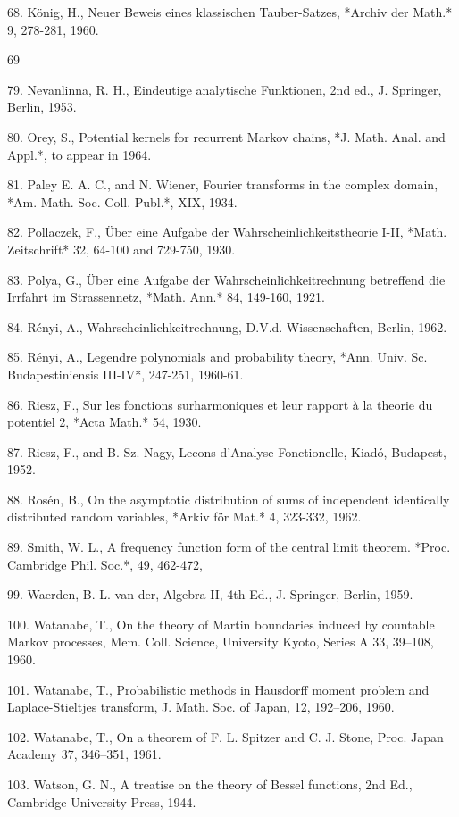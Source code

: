 68. König, H., Neuer Beweis eines klassischen Tauber-Satzes, *Archiv der Math.* 9, 278-281, 1960.

69

79. Nevanlinna, R. H., Eindeutige analytische Funktionen, 2nd ed., J. Springer, Berlin, 1953.

80. Orey, S., Potential kernels for recurrent Markov chains, *J. Math. Anal. and Appl.*, to appear in 1964.

81. Paley E. A. C., and N. Wiener, Fourier transforms in the complex domain, *Am. Math. Soc. Coll. Publ.*, XIX, 1934.

82. Pollaczek, F., Über eine Aufgabe der Wahrscheinlichkeitstheorie I-II, *Math. Zeitschrift* 32, 64-100 and 729-750, 1930.

83. Polya, G., Über eine Aufgabe der Wahrscheinlichkeitrechnung betreffend die Irrfahrt im Strassennetz, *Math. Ann.* 84, 149-160, 1921.

84. Rényi, A., Wahrscheinlichkeitrechnung, D.V.d. Wissenschaften, Berlin, 1962.

85. Rényi, A., Legendre polynomials and probability theory, *Ann. Univ. Sc. Budapestiniensis III-IV*, 247-251, 1960-61.

86. Riesz, F., Sur les fonctions surharmoniques et leur rapport à la theorie du potentiel 2, *Acta Math.* 54, 1930.

87. Riesz, F., and B. Sz.-Nagy, Lecons d'Analyse Fonctionelle, Kiadó, Budapest, 1952.

88. Rosén, B., On the asymptotic distribution of sums of independent identically distributed random variables, *Arkiv för Mat.* 4, 323-332, 1962.

89. Smith, W. L., A frequency function form of the central limit theorem. *Proc. Cambridge Phil. Soc.*, 49, 462-472,

99. Waerden, B. L. van der, Algebra II, 4th Ed., J. Springer, Berlin, 1959.

100. Watanabe, T., On the theory of Martin boundaries induced by countable Markov processes, Mem. Coll. Science, University Kyoto, Series A 33, 39–108, 1960.

101. Watanabe, T., Probabilistic methods in Hausdorff moment problem and Laplace-Stieltjes transform, J. Math. Soc. of Japan, 12, 192–206, 1960.

102. Watanabe, T., On a theorem of F. L. Spitzer and C. J. Stone, Proc. Japan Academy 37, 346–351, 1961.

103. Watson, G. N., A treatise on the theory of Bessel functions, 2nd Ed., Cambridge University Press, 1944.

